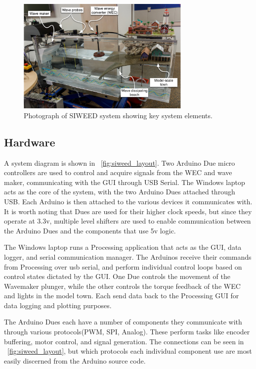\documentclass[11pt, letterpaper]{article}
\begin{document}
\begin{figure}[tb]
  \centering
  \includegraphics[width=0.75\textwidth]{diagrams/siweed_photo_with_callouts.pdf}
  \caption{Photograph of SIWEED system showing key system elements.}
  \label{fig:siweed_photo_with_callouts}
\end{figure}

\subsection{Hardware}
A system diagram is shown in \figurename~\ref{fig:siweed_layout}.
Two Arduino Due micro controllers are used to control and acquire signals from the WEC and wave maker, communicating with the GUI through USB Serial.
The Windows laptop acts as the core of the system, with the two Arduino Dues attached through USB. 
Each Arduino is then attached to the various devices it communicates with.
It is worth noting that Dues are used for their higher clock speeds, but since they operate at 3.3v, multiple level shifters are used to enable communication between the Arduino Dues and the components that use 5v logic.

The Windows laptop runs a Processing application that acts as the GUI, data logger, and serial communication manager.
The Arduinos receive their commands from Processing over usb serial, and perform individual control loops based on control states dictated by the GUI.
One Due controls the movement of the Wavemaker plunger, while the other controls the torque feedback of the WEC and lights in the model town.
Each send data back to the Processing GUI for data logging and plotting purposes.

The Arduino Dues each have a number of components they communicate with through various protocols(PWM, SPI, Analog).
These perform tasks like encoder buffering, motor control, and signal generation.
The connections can be seen in \figurename~\ref{fig:siweed_layout}, but which protocols each individual component use are most easily discerned from the Arduino source code.
\end{document}
